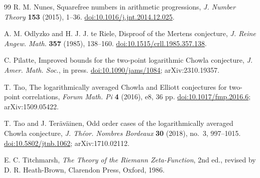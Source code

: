 \documentclass[11pt]{amsart}
\numberwithin{equation}{section}
\theoremstyle{plain}
\theoremstyle{definition}
\theoremstyle{remark}
\begin{document}
\begin{thebibliography}{99}
R. M. Nunes,
Squarefree numbers in arithmetic progressions,
\emph{J. Number Theory} \textbf{153} (2015), 1--36.
\href{https://doi.org/10.1016/j.jnt.2014.12.025}{doi:10.1016/j.jnt.2014.12.025}.

A. M. Odlyzko and H. J. J. te Riele,
Disproof of the Mertens conjecture,
\emph{J. Reine Angew. Math.} \textbf{357} (1985), 138--160.
\href{https://doi.org/10.1515/crll.1985.357.138}{doi:10.1515/crll.1985.357.138}.

C. Pilatte,
Improved bounds for the two-point logarithmic Chowla conjecture,
\emph{J. Amer. Math. Soc.}, in press.
\href{https://doi.org/10.1090/jams/1084}{doi:10.1090/jams/1084};
arXiv:2310.19357.

T. Tao,
The logarithmically averaged Chowla and Elliott conjectures for two-point correlations,
\emph{Forum Math. Pi} \textbf{4} (2016), e8, 36 pp.
\href{https://doi.org/10.1017/fmp.2016.6}{doi:10.1017/fmp.2016.6};
arXiv:1509.05422.

T. Tao and J. Ter\"av\"ainen,
Odd order cases of the logarithmically averaged Chowla conjecture,
\emph{J. Th\'eor. Nombres Bordeaux} \textbf{30} (2018), no.~3, 997--1015.
\href{https://doi.org/10.5802/jtnb.1062}{doi:10.5802/jtnb.1062};
arXiv:1710.02112.

E. C. Titchmarsh,
\emph{The Theory of the Riemann Zeta-Function},
2nd ed., revised by D. R. Heath-Brown, Clarendon Press, Oxford, 1986.

\end{thebibliography}
\end{document}
